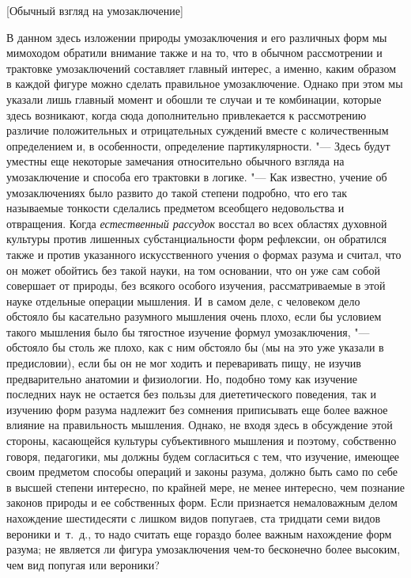 %
  {[Обычный взгляд на умозаключение]}

В данном здесь изложении природы умозаключения и его различных
форм мы мимоходом обратили внимание также и на то, что в обычном
рассмотрении и трактовке умозаключений составляет главный
интерес, а именно, каким образом в каждой фигуре можно сделать правильное
умозаключение. Однако при этом мы указали лишь главный момент и обошли те
случаи и те комбинации, которые здесь возникают, когда сюда дополнительно
привлекается к рассмотрению различие положительных и отрицательных суждений
вместе с количественным определением и, в особенности, определение
партикулярности. "--- Здесь будут уместны еще некоторые
замечания относительно обычного взгляда на умозаключение и способа его
трактовки в логике. "--- Как известно, учение об умозаключениях
было развито до такой степени подробно, что его так называемые тонкости
сделались предметом всеобщего недовольства и отвращения. Когда
{\em естественный рассудок}
восстал во всех областях духовной культуры против лишенных
субстанциальности форм рефлексии, он обратился также и против указанного
искусственного учения о формах разума и считал, что он может обойтись без
такой науки, на том основании, что он уже сам собой совершает от природы,
без всякого особого изучения, рассматриваемые в этой науке отдельные
операции мышления. И~в самом деле, с человеком дело обстояло бы касательно
разумного мышления очень плохо, если бы условием такого мышления было бы
тягостное изучение формул умозаключения, "--- обстояло бы столь
же плохо, как с ним обстояло бы (мы на это уже указали в
предисловии),
если бы он не мог ходить и переваривать пищу, не изучив
предварительно анатомии и физиологии. Но, подобно тому как изучение
последних наук не остается без пользы для диететического поведения, так и
изучению форм разума надлежит без сомнения приписывать еще более важное
влияние на правильность мышления. Однако, не входя здесь в обсуждение этой
стороны, касающейся культуры субъективного мышления и поэтому, собственно
говоря, педагогики, мы должны будем согласиться с тем, что изучение,
имеющее своим предметом способы операций и законы разума, должно быть само
по себе в высшей степени интересно, по крайней мере, не менее интересно,
чем познание законов природы и ее собственных форм. Если признается
немаловажным делом нахождение шестидесяти с лишком видов попугаев, ста
тридцати семи видов вероники и~т.~д., то надо считать еще гораздо более
важным нахождение форм разума; не является ли фигура умозаключения чем-то
бесконечно более высоким, чем вид попугая или вероники?

